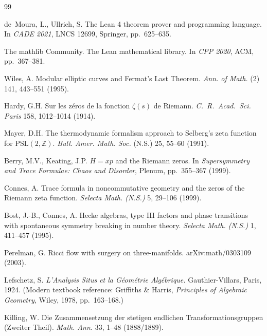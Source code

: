 \documentclass[11pt,a4paper]{amsart}
\theoremstyle{plain}
\theoremstyle{definition}
\begin{document}
\begin{thebibliography}{99}

de~Moura, L., Ullrich, S.
\newblock The Lean 4 theorem prover and programming language.
\newblock In \emph{CADE 2021}, LNCS 12699, Springer, pp.~625--635.

The mathlib Community.
\newblock The Lean mathematical library.
\newblock In \emph{CPP 2020}, ACM, pp.~367--381.

Wiles, A.
\newblock Modular elliptic curves and Fermat's Last Theorem.
\newblock \emph{Ann. of Math.} (2) 141, 443--551 (1995).

Hardy, G.H.
\newblock Sur les z\'eros de la fonction $\zeta(s)$ de Riemann.
\newblock \emph{C.~R.~Acad.~Sci. Paris} 158, 1012--1014 (1914).

Mayer, D.H.
\newblock The thermodynamic formalism approach to Selberg's zeta function for $\mathrm{PSL}(2,\mathbb{Z})$.
\newblock \emph{Bull. Amer. Math. Soc.} (N.S.) 25, 55--60 (1991).

Berry, M.V., Keating, J.P.
\newblock $H = xp$ and the Riemann zeros.
\newblock In \emph{Supersymmetry and Trace Formulae: Chaos and Disorder}, Plenum, pp.~355--367 (1999).

Connes, A.
\newblock Trace formula in noncommutative geometry and the zeros of the Riemann zeta function.
\newblock \emph{Selecta Math. (N.S.)} 5, 29--106 (1999).

Bost, J.-B., Connes, A.
\newblock Hecke algebras, type III factors and phase transitions with spontaneous symmetry breaking in number theory.
\newblock \emph{Selecta Math. (N.S.)} 1, 411--457 (1995).

Perelman, G.
\newblock Ricci flow with surgery on three-manifolds.
\newblock arXiv:math/0303109 (2003).

Lefschetz, S.
\newblock \emph{L'Analysis Situs et la G\'eom\'etrie Alg\'ebrique.}
\newblock Gauthier-Villars, Paris, 1924. (Modern textbook reference: Griffiths \& Harris, \emph{Principles of Algebraic Geometry}, Wiley, 1978, pp.~163--168.)

Killing, W.
\newblock Die Zusammensetzung der stetigen endlichen Transformationsgruppen (Zweiter Theil).
\newblock \emph{Math. Ann.} 33, 1--48 (1888/1889).


\end{thebibliography}
\end{document}
